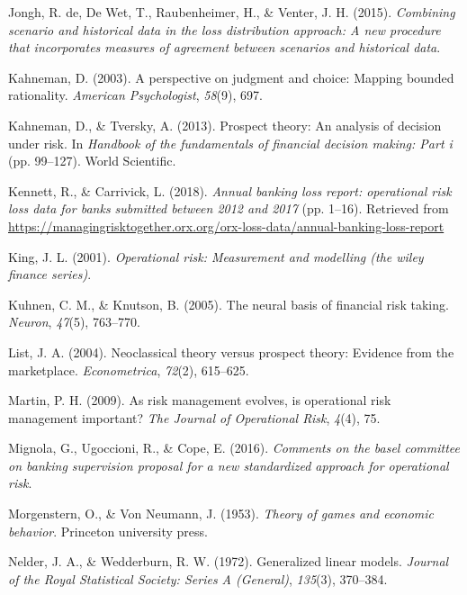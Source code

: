 \documentclass{DissertateUSU}
\begin{document}
\leavevmode\hypertarget{ref-de2015combining}{}%
Jongh, R. de, De Wet, T., Raubenheimer, H., \& Venter, J. H. (2015).
\emph{Combining scenario and historical data in the loss distribution
approach: A new procedure that incorporates measures of agreement
between scenarios and historical data}.

\leavevmode\hypertarget{ref-kahneman2003perspective}{}%
Kahneman, D. (2003). A perspective on judgment and choice: Mapping
bounded rationality. \emph{American Psychologist}, \emph{58}(9), 697.

\leavevmode\hypertarget{ref-kahneman2013prospect}{}%
Kahneman, D., \& Tversky, A. (2013). Prospect theory: An analysis of
decision under risk. In \emph{Handbook of the fundamentals of financial
decision making: Part i} (pp. 99--127). World Scientific.

\leavevmode\hypertarget{ref-orxablr2018}{}%
Kennett, R., \& Carrivick, L. (2018). \emph{Annual banking loss report:
operational risk loss data for banks submitted between 2012 and 2017}
(pp. 1--16). Retrieved from
\url{https://managingrisktogether.orx.org/orx-loss-data/annual-banking-loss-report}

\leavevmode\hypertarget{ref-king2001operational}{}%
King, J. L. (2001). \emph{Operational risk: Measurement and modelling
(the wiley finance series)}.

\leavevmode\hypertarget{ref-kuhnen2005neural}{}%
Kuhnen, C. M., \& Knutson, B. (2005). The neural basis of financial risk
taking. \emph{Neuron}, \emph{47}(5), 763--770.

\leavevmode\hypertarget{ref-list2004neoclassical}{}%
List, J. A. (2004). Neoclassical theory versus prospect theory: Evidence
from the marketplace. \emph{Econometrica}, \emph{72}(2), 615--625.

\leavevmode\hypertarget{ref-martin2009risk}{}%
Martin, P. H. (2009). As risk management evolves, is operational risk
management important? \emph{The Journal of Operational Risk},
\emph{4}(4), 75.

\leavevmode\hypertarget{ref-mignola2016comments}{}%
Mignola, G., Ugoccioni, R., \& Cope, E. (2016). \emph{Comments on the
basel committee on banking supervision proposal for a new standardized
approach for operational risk}.

\leavevmode\hypertarget{ref-morgenstern1953theory}{}%
Morgenstern, O., \& Von Neumann, J. (1953). \emph{Theory of games and
economic behavior}. Princeton university press.

\leavevmode\hypertarget{ref-nelder1972generalized}{}%
Nelder, J. A., \& Wedderburn, R. W. (1972). Generalized linear models.
\emph{Journal of the Royal Statistical Society: Series A (General)},
\emph{135}(3), 370--384.
\end{document}
